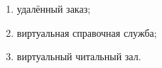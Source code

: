 \begin{enumerate}
  \item[а)] удалённый заказ;
  \item[ё)] виртуальная справочная служба; %
  \item[з)] виртуальный читальный зал. %
\end{enumerate}
